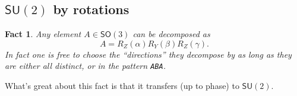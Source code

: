 \documentclass[12pt,dvipsnames]{article}
\newcommand{\SU}[1]{\mathsf{SU} (#1)}
\newcommand{\SO}[1]{\mathsf{SO} (#1)}
\newcommand{\1}{\mathbb{1}}
\theoremstyle{plain}
\newtheorem{fact}[theorem]{Fact}
\begin{document}
\subsection{$\SU{2}$ by rotations}

\begin{fact}
    Any element $A\in\SO{3}$ can be decomposed as
    \begin{equation}
        A = R_Z(\alpha)R_Y(\beta)R_Z(\gamma).
    \end{equation}
    In fact one is free to choose the ``directions'' they decompose by as long as they are either all distinct, or in the pattern \texttt{ABA}.
\end{fact}

What's great about this fact is that it transfers (up to phase) to $\SU{2}$.
\end{document}
